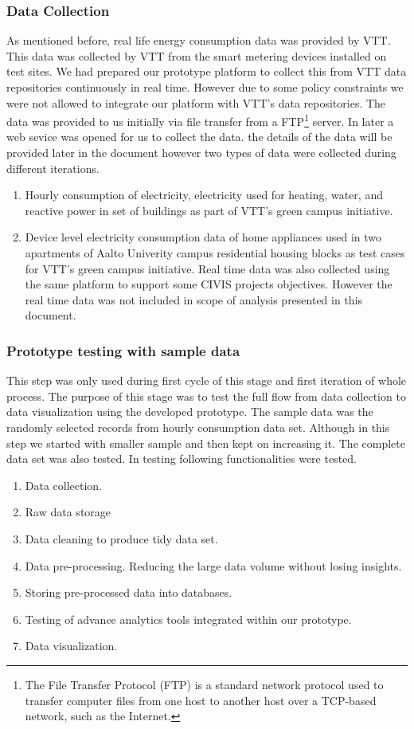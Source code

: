\subsubsection{Data Collection}
As mentioned before, real life energy consumption data was provided by VTT. This data was collected by VTT from the smart metering devices installed on test sites. We had prepared our prototype platform to collect this from VTT data repositories continuously in real time. However due to some policy constraints we were not allowed to integrate our platform with VTT's data repositories. The data was provided to us initially via file transfer from a FTP\footnote{The File Transfer Protocol (FTP) is a standard network protocol used to transfer computer files from one host to another host over a TCP-based network, such as the Internet.} server. In later a web sevice was opened for us to collect the data. the details of the data will be provided later in the document however two types of data were collected during different iterations.
\begin{enumerate}
\item Hourly consumption of electricity, electricity used for heating, water, and reactive power in set of buildings as part of VTT's green campus initiative.
\item Device level electricity consumption data of home appliances used in two apartments of Aalto Univerity campus residential housing blocks as test cases for VTT's green campus initiative.
Real time data was also collected using the same platform to support some CIVIS projects objectives. However the real time data was not included in scope of analysis presented in this document.  
\end{enumerate}
\subsubsection{Prototype testing with sample data}\label{prototype}
This step was only used during first cycle of this stage and first iteration of whole process. The purpose of this stage was to test the full flow from data collection to data visualization using the developed prototype. The sample data was the randomly selected records from hourly consumption data set. Although in this step we started with smaller sample and then kept on increasing it. The complete data set was also tested. In testing following functionalities were tested.
\begin{enumerate}
\item Data collection.
\item Raw data storage
\item Data cleaning to produce tidy data set.
\item Data pre-processing. Reducing the large data volume without losing insights. 
\item Storing pre-processed data into databases.
\item Testing of advance analytics tools integrated within our prototype.
\item Data visualization.  
\end{enumerate}
